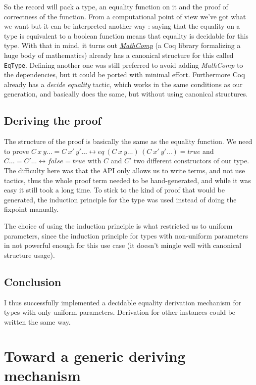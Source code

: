 \documentclass{article}
\begin{document}
So the record will pack a type, an equality function on it and the proof of
correctness of the function. From a computational point of view we've got what we
want but it can be interpreted another way : saying that the equality on a
type is equivalent to a boolean function means that equality is decidable for
this type. With that in mind, it turns out
\href{https://github.com/math-comp/math-comp}{\emph{MathComp}} (a Coq library
formalizing a huge body of mathematics) already has a
canonical structure for this called \texttt{EqType}. Defining another one was
still preferred to avoid adding \emph{MathComp} to the dependencies, but it
could be ported with minimal effort. Furthermore Coq already has a
\emph{decide equality} tactic, which works in the same conditions as our
generation, and basically does the same, but without using canonical structures.

\subsection{Deriving the proof}

The structure of the proof is basically the same as the equality function. We
need to prove $C~x~y\ldots = C~x'~y'\ldots \leftrightarrow eq~(C~x~y\ldots)~(C~x'~y'\ldots) = true$
and $C\ldots = C'\ldots \leftrightarrow false = true$ with $C$ and $C'$ two
different constructors of our type. The difficulty here was that the API only
allows us to write terms, and not use tactics, thus the whole proof term needed
to be hand-generated, and while it was easy it still took a long time. To stick
to the kind of proof that would be generated, the induction principle for the
type was used instead of doing the fixpoint manually.

The choice of using the induction principle is what restricted us to uniform
parameters, since the induction principle for types with non-uniform parameters
in not powerful enough for this use case (it doesn't mingle well with canonical
structure usage).

\subsection{Conclusion}

I thus successfully implemented a decidable equality derivation mechanism for
types with only uniform parameters. Derivation for other instances could be
written the same way.

\section{Toward a generic deriving mechanism}\label{gender}
\end{document}
